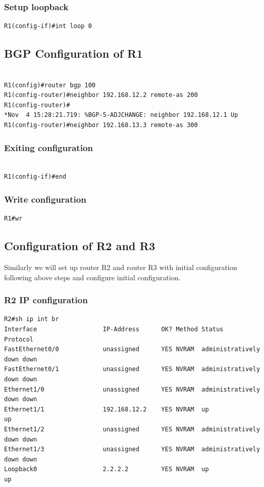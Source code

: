 \documentclass[paper=letter, fontsize=12pt]{article}
\begin{document}
\subsubsection{Setup loopback}
\begin{verbatim}
R1(config-if)#int loop 0
\end{verbatim}

\subsection{BGP Configuration of R1}
\begin{verbatim}

R1(config)#router bgp 100
R1(config-router)#neighbor 192.168.12.2 remote-as 200 
R1(config-router)#
*Nov  4 15:28:21.719: %BGP-5-ADJCHANGE: neighbor 192.168.12.1 Up
R1(config-router)#neighbor 192.168.13.3 remote-as 300 
\end{verbatim}

\subsubsection{Exiting configuration}
\begin{verbatim}

R1(config-if)#end
\end{verbatim}

\subsubsection{Write configuration}
\begin{verbatim}
R1#wr
\end{verbatim}

\subsection{Configuration of R2 and R3}
Similarly we will set up router R2 and router R3 with initial configuration following above steps and configure initial configuration.

\subsubsection{R2 IP configuration}
\begin{verbatim}
R2#sh ip int br
Interface                  IP-Address      OK? Method Status                Protocol
FastEthernet0/0            unassigned      YES NVRAM  administratively down down
FastEthernet0/1            unassigned      YES NVRAM  administratively down down
Ethernet1/0                unassigned      YES NVRAM  administratively down down
Ethernet1/1                192.168.12.2    YES NVRAM  up                    up
Ethernet1/2                unassigned      YES NVRAM  administratively down down
Ethernet1/3                unassigned      YES NVRAM  administratively down down
Loopback0                  2.2.2.2         YES NVRAM  up                    up
\end{verbatim}
\end{document}
